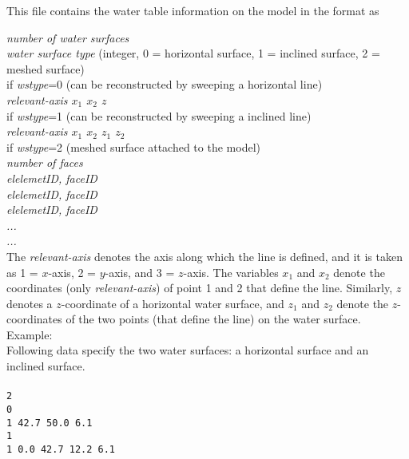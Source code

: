 This file contains the water table information on the model in the format as

\emph{number of water surfaces}\\
\emph{water surface type} (integer, 0 = horizontal surface, 1 = inclined surface, 2 = meshed surface)\\
if \emph{wstype}=0 (can be reconstructed by sweeping a horizontal line)\\
  \emph{relevant-axis $x_1$ $x_2$ $z$}\\
if \emph{wstype}=1 (can be reconstructed by sweeping a inclined line)\\
  \emph{relevant-axis $x_1$ $x_2$ $z_1$ $z_2$}\\
if \emph{wstype}=2 (meshed surface attached to the model)\\
  \emph{number of faces\\
  elelemetID, faceID\\
  elelemetID, faceID\\
  elelemetID, faceID\\
  ...\\
  ...}\\

The \emph{relevant-axis} denotes the axis along which the line is defined, and it is taken as 1 = $x$-axis, 2 = $y$-axis, and 3 = $z$-axis. The variables $x_1$ and $x_2$ denote the coordinates (only \emph{relevant-axis}) of point 1 and 2 that define the line. Similarly, $z$ denotes a $z$-coordinate of a horizontal water surface, and $z_1$ and $z_2$ denote the $z$-coordinates of the two points (that define the line) on the water surface.\\


Example:\\
Following data specify the two water surfaces: a horizontal surface and an inclined surface.\\\\
\texttt{2\\
0\\
1 42.7 50.0 6.1\\
1\\
1 0.0 42.7 12.2 6.1}\\
